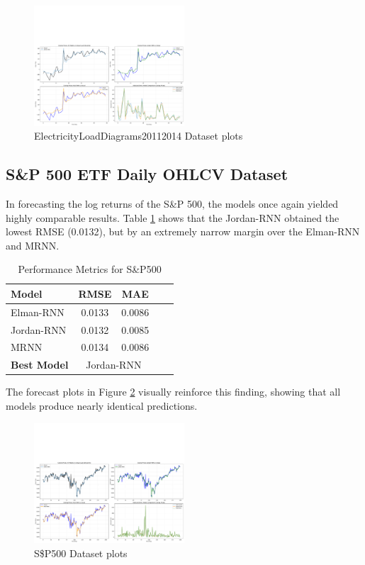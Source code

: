 \documentclass[conference, 10pt]{IEEEtran}
\begin{document}
\begin{figure}[H]
    \centering
    \includegraphics[width=0.5\textwidth]{plots/rnn_model_comparison_elec.pdf}
    \caption{ElectricityLoadDiagrams20112014 Dataset plots}
    \label{fig:plots_elec}
\end{figure}


\subsection{S\&P 500 ETF Daily OHLCV Dataset}
In forecasting the log returns of the S\&P 500, the models once again yielded highly comparable results. Table
\ref{tab:results_spy} shows that the Jordan-RNN obtained the lowest RMSE (0.0132), but by an extremely narrow margin
over the Elman-RNN and MRNN. 
\begin{table}[H]
    \centering
    \begin{tabular}{|l|c|c|c|c|}
        \hline
        \textbf{Model}& \textbf{RMSE} & \textbf{MAE}\\ 
        \hline
        Elman-RNN& 0.0133 & 0.0086 \\ 
        \hline
        Jordan-RNN & 0.0132 & 0.0085\\ 
        \hline
        MRNN & 0.0134 & 0.0086 \\ 
        \hline
        \textbf{Best Model} & \multicolumn{2}{c|}{{Jordan-RNN}} \\ 
        \hline
    \end{tabular}
    \vspace{4pt}
    \caption{Performance Metrics for S\&P500}
    \label{tab:results_spy}
\end{table}

The forecast plots in Figure \ref{fig:plots_spy} visually reinforce this finding, showing
that all models produce nearly identical predictions.

\begin{figure}[H]
    \centering
    \includegraphics[width=0.5\textwidth]{plots/rnn_model_comparison_spy.pdf}
    \caption{S\$P500 Dataset plots}
    \label{fig:plots_spy}
\end{figure}
\end{document}
